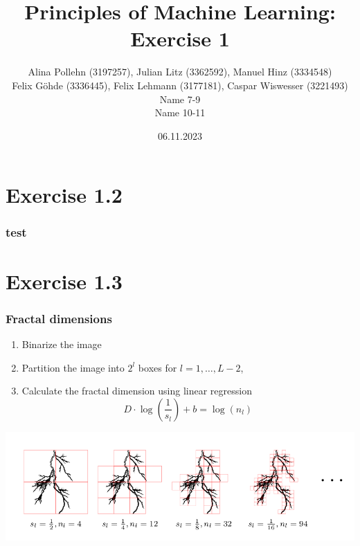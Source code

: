 \documentclass[10pt,aspectratio=169,handout]{beamer}
\begin{document}
\title{Principles of Machine Learning: Exercise 1}
\date{06.11.2023}
\author{Alina Pollehn (3197257), Julian Litz (3362592), Manuel Hinz (3334548)\\Felix Göhde (3336445), Felix Lehmann (3177181), Caspar Wiswesser (3221493) \\Name 7-9\\ Name 10-11}

\begin{frame}
    \maketitle
\end{frame}

\section{Exercise 1.2}

\begin{frame}
    \frametitle{test}
\end{frame}


\section{Exercise 1.3}

\begin{frame}
    \frametitle{Fractal dimensions}

    \begin{enumerate}
        \item Binarize the image
        \item Partition the image into $2^l$ boxes for $l=1,\dots,L-2$,
        \item Calculate the fractal dimension using linear regression \[D\cdot \log\left(\frac{1}{s_l}\right)+b=\log(n_l)\] 
    \end{enumerate}    
    \includegraphics[scale=0.4]{images/boxes.png}

\end{frame}
\end{document}
